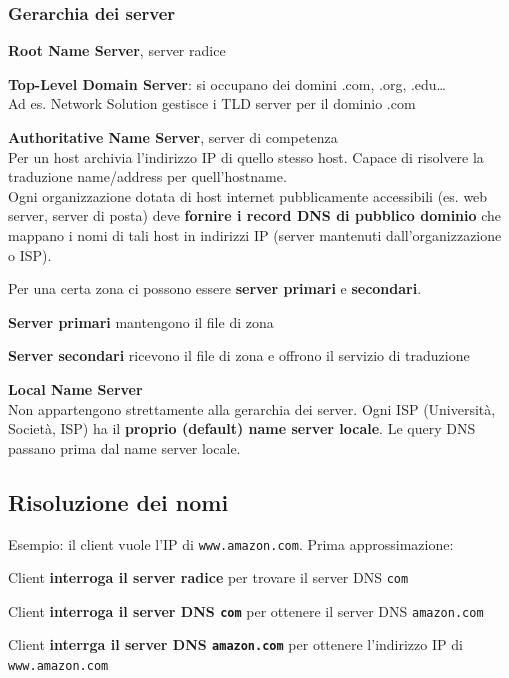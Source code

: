 \documentclass[10pt]{article}
\begin{document}
\subsubsection{Gerarchia dei server}
\begin{list}{}{}
\item \textbf{Root Name Server}, server radice
\item \textbf{Top-Level Domain Server}: si occupano dei domini .com, .org, .edu\ldots\\
Ad es. Network Solution gestisce i TLD server per il dominio .com
\item \textbf{Authoritative Name Server}, server di competenza\\
Per un host archivia l'indirizzo IP di quello stesso host. Capace di risolvere la traduzione name/address per quell'hostname.\\
Ogni organizzazione dotata di host internet pubblicamente accessibili (es. web server, server di posta) deve \textbf{fornire i record DNS di pubblico dominio} che mappano i nomi di tali host in indirizzi IP (server mantenuti dall'organizzazione o ISP).
\item Per una certa zona ci possono essere \textbf{server primari} e \textbf{secondari}.
\begin{list}{}{}
\item \textbf{Server primari} mantengono il file di zona
\item \textbf{Server secondari} ricevono il file di zona e offrono il servizio di traduzione
\end{list}
\item \textbf{Local Name Server}\\
Non appartengono strettamente alla gerarchia dei server. Ogni ISP (Università, Società, ISP) ha il \textbf{proprio (default) name server locale}. Le query DNS passano prima dal name server locale.
\end{list}
\pagebreak
\subsection{Risoluzione dei nomi}
Esempio: il client vuole l'IP di \texttt{www.amazon.com}. Prima approssimazione:
\begin{list}{}{}
\item Client \textbf{interroga il server radice} per trovare il server DNS \texttt{com}
\item Client \textbf{interroga il server DNS \texttt{com}} per ottenere il server DNS \texttt{amazon.com}
\item Client \textbf{interrga il server DNS \texttt{amazon.com}} per ottenere l'indirizzo IP di \texttt{www.amazon.com}
\end{list}
\end{document}
